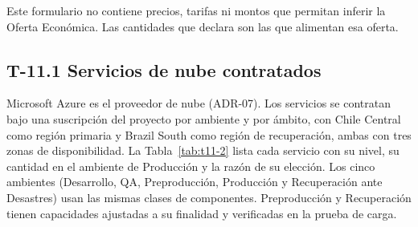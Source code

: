\documentclass[11pt]{article}
\begin{document}
Este formulario no contiene precios, tarifas ni montos que permitan inferir la Oferta Económica. Las cantidades que declara son las que alimentan esa oferta.

\subsection{T-11.1 Servicios de nube contratados}\label{t-11-1}

Microsoft Azure es el proveedor de nube (ADR-07). Los servicios se contratan bajo una suscripción del proyecto por ambiente y por ámbito, con Chile Central como región primaria y Brazil South como región de recuperación, ambas con tres zonas de disponibilidad. La Tabla~\mbox{\ref{tab:t11-2}} lista cada servicio con su nivel, su cantidad en el ambiente de Producción y la razón de su elección. Los cinco ambientes (Desarrollo, QA, Preproducción, Producción y Recuperación ante Desastres) usan las mismas clases de componentes. Preproducción y Recuperación tienen capacidades ajustadas a su finalidad y verificadas en la prueba de carga.
\end{document}
